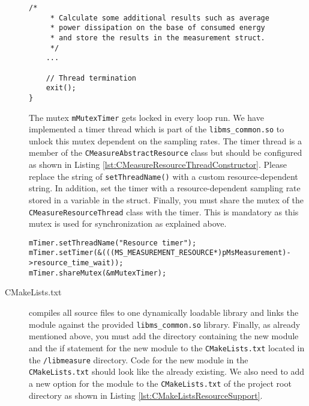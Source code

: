 \begin{description}
\begin{lstlisting}[caption={Scheme of the \texttt{run()} method that each \texttt{CMeasureResourceThread} must have. \added[id=ck]{Listing aktualisiert}}, label=lst:RunMethodScheme]
	/* 
	 * Calculate some additional results such as average
	 * power dissipation on the base of consumed energy
	 * and store the results in the measurement struct.
	 */
	...
	
	// Thread termination
	exit();
}	
\end{lstlisting}
	The mutex \texttt{mMutexTimer} gets locked in every loop run. We have implemented a timer thread which is part of the \texttt{libms\_common.so} to unlock this mutex dependent on the sampling rates. The timer thread is a member of the \texttt{CMeasureAbstractResource} class but should be configured as shown in Listing \ref{lst:CMeasureResourceThreadConstructor}. Please replace the string of \texttt{setThreadName()} with a custom resource-dependent string. In addition, set the timer with a resource-dependent sampling rate stored in a variable in the  struct. Finally, you must share the mutex of the \texttt{CMeasureResourceThread} class with the timer. This is mandatory as this mutex is used for synchronization as explained above.

\begin{lstlisting}[caption={\texttt{CMeasureResourceThread} constructor template.},label=lst:CMeasureResourceThreadConstructor]
mTimer.setThreadName("Resource timer");
mTimer.setTimer(&(((MS_MEASUREMENT_RESOURCE*)pMsMeasurement)->resource_time_wait));
mTimer.shareMutex(&mMutexTimer);
\end{lstlisting}
	
	\item[CMakeLists.txt] compiles all source files to one dynamically loadable library and links the module against the provided \texttt{libms\_common.so} library. Finally, as already mentioned above, you must add the directory containing the new module and the if statement for the new module to the \texttt{CMakeLists.txt} located in the \texttt{/libmeasure} directory. Code for the new module in the \texttt{CMakeLists.txt} should look like the already existing. We also need to add a new option for the module to the \texttt{CMakeLists.txt} of the project root directory as shown in Listing \ref{lst:CMakeListsResourceSupport}.
\end{description}

